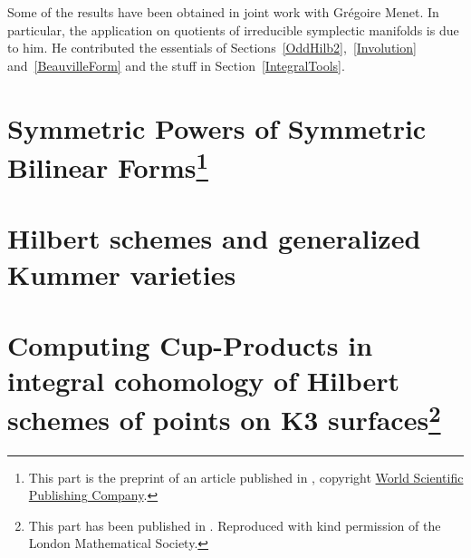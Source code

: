 \documentclass[11pt,twoside]{article}
\begin{document}
Some of the results have been obtained in joint work with Gr\'egoire Menet. In particular, the application on quotients of irreducible symplectic manifolds is due to him.
He contributed the essentials of Sections~\ref{OddHilb2},~\ref{Involution} and~\ref{BeauvilleForm} and the stuff in Section~\ref{IntegralTools}.


\cleardoublepage

\tableofcontents

\cleardoublepage


\pagestyle{fancy}




\newpage
\part[Symmetric Powers of Symmetric Bilinear Forms]{Symmetric Powers of Symmetric Bilinear Forms\protect\footnote{This part is the preprint of an article published in \cite{Kapfer}, copyright \href{http://www.worldscientific.com/worldscinet/ccm}{World Scientific Publishing Company}.}}

\newpage
\part{Hilbert schemes and generalized Kummer varieties}






\label{integralcohomology}





\newpage
\part[Computing Cup-Products in integral cohomology of Hilbert schemes of points on K3 surfaces]{Computing Cup-Products in integral cohomology of Hilbert schemes of points on K3 surfaces\protect\footnote{This part has been published in \cite{Kapfer2}. Reproduced with kind permission of the London Mathematical Society.}}



\appendix

\clearpage

\clearpage

\newpage

\end{document}
